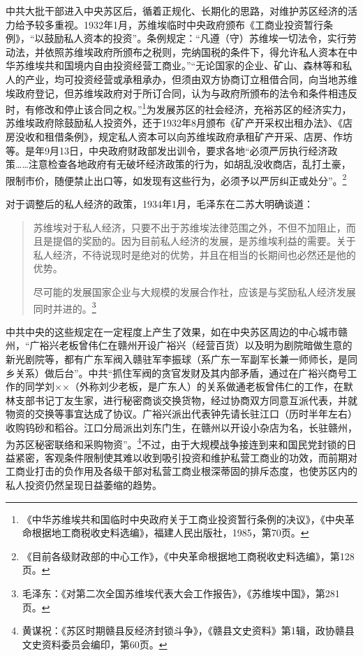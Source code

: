 中共大批干部进入中央苏区后，循着正规化、长期化的思路，对维护苏区经济的活力给予较多重视。1932年1月，苏维埃临时中央政府颁布《工商业投资暂行条例》，“以鼓励私人资本的投资”。条例规定：“凡遵（守）苏维埃一切法令，实行劳动法，并依照苏维埃政府所颁布之税则，完纳国税的条件下，得允许私人资本在中华苏维埃共和国境内自由投资经营工商业。”“无论国家的企业、矿山、森林等和私人的产业，均可投资经营或承租承办，但须由双方协商订立租借合同，向当地苏维埃政府登记，但苏维埃政府对于所订合同，认为与政府所颁布的法令和条件相违反时，有修改和停止该合同之权。”\footnote{《中华苏维埃共和国临时中央政府关于工商业投资暂行条例的决议》，《中央革命根据地工商税收史料选编》，福建人民出版社，1985，第70页。}为发展苏区的社会经济，充裕苏区的经济实力，苏维埃政府除鼓励私人投资外，还于1932年8月颁布《矿产开采权出租办法》、《店房没收和租借条例》，规定私人资本可以向苏维埃政府承租矿产开采、店房、作坊等。是年9月13日，中央政府财政部发出训令，要求各地“必须严厉执行经济政策……注意检查各地政府有无破坏经济政策的行为，如胡乱没收商店，乱打土豪，限制市价，随便禁止出口等，如发现有这些行为，必须予以严厉纠正或处分”。\footnote{《目前各级财政部的中心工作》，《中央革命根据地工商税收史料选编》，第128页。}


对于调整后的私人经济的政策，1934年1月，毛泽东在二苏大明确谈道：

\begin{quote}

苏维埃对于私人经济，只要不出于苏维埃法律范围之外，不但不加阻止，而且是提倡的奖励的。因为目前私人经济的发展，是苏维埃利益的需要。关于私人经济，不待说现时是绝对的优势，并且在相当的长期间也必然还是他的优势。

尽可能的发展国家企业与大规模的发展合作社，应该是与奖励私人经济发展同时并进的。\footnote{毛泽东：《对第二次全国苏维埃代表大会工作报告》，《苏维埃中国》，第281页。}
\end{quote}


中共中央的这些规定在一定程度上产生了效果，如在中央苏区周边的中心城市赣州，“广裕兴老板曾伟仁在赣州开设广裕兴（经营百货）以及明为剧院暗做生意的新光剧院等，都有广东军阀入赣驻军李振球（系广东一军副军长兼一师师长，是同乡关系）做后台”。中共“抓住军阀的贪官发财及其内部矛盾，通过在广裕兴商号工作的同学刘××（外称刘少老板，是广东人）的关系做通老板曾伟仁的工作，在默林支部书记丁友生家，进行秘密商谈交换货物，经过协商双方同意互派代表，并就物资的交换等事宜达成了协议。广裕兴派出代表钟先请长驻江口（历时半年左右）收购钨砂和稻谷。江口分局派出刘东门生，在赣州以开设小杂店为名，长驻赣州，为苏区秘密联络和采购物资”。\footnote{黄谋祝：《苏区时期赣县反经济封锁斗争》，《赣县文史资料》第1辑，政协赣县文史资料委员会编印，第60页。}不过，由于大规模战争接连到来和国民党封锁的日益紧密，客观条件限制使其难以收到吸引投资和维护私营工商业的功效，而前期对工商业打击的负作用及各级干部对私营工商业根深蒂固的排斥态度，也使苏区内的私人投资仍然呈现日益萎缩的趋势。

